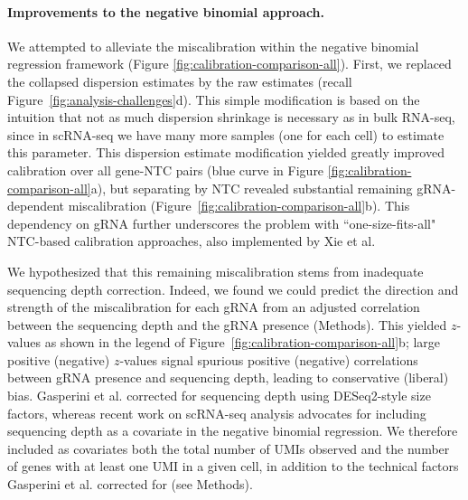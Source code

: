 \documentclass{nature}
\begin{document}
\clearpage

\paragraph{Improvements to the negative binomial approach.} 

We attempted to alleviate the miscalibration within the negative binomial regression framework (Figure \ref{fig:calibration-comparison-all}). First, we replaced the collapsed dispersion estimates by the raw estimates (recall Figure~\ref{fig:analysis-challenges}d). This simple modification is based on the intuition that not as much dispersion shrinkage is necessary as in bulk RNA-seq, since in scRNA-seq we have many more samples (one for each cell) to estimate this parameter. This dispersion estimate modification yielded greatly improved calibration over all gene-NTC pairs (blue curve in Figure \ref{fig:calibration-comparison-all}a), but separating by NTC revealed substantial remaining gRNA-dependent miscalibration (Figure~\ref{fig:calibration-comparison-all}b). 
This dependency on gRNA further underscores the problem with ``one-size-fits-all" NTC-based calibration approaches, also implemented by Xie et al.\cite{Xie2019}

We hypothesized that this remaining miscalibration stems from inadequate sequencing depth correction. Indeed, we found we could predict the direction and strength of the miscalibration for each gRNA from an adjusted correlation between the sequencing depth and the gRNA presence (Methods). This yielded $z$-values as shown in the legend of Figure~\ref{fig:calibration-comparison-all}b; large positive (negative) $z$-values signal spurious positive (negative) correlations between gRNA presence and sequencing depth, leading to conservative (liberal) bias. Gasperini et al. corrected for sequencing depth using DESeq2-style size factors, whereas recent work on scRNA-seq analysis\cite{Hafemeister2019} advocates for including sequencing depth as a covariate in the negative binomial regression. We therefore included as covariates both the total number of UMIs observed and the number of genes with at least one UMI in a given cell, in addition to the technical factors Gasperini et al. corrected for (see Methods). 
\end{document}
